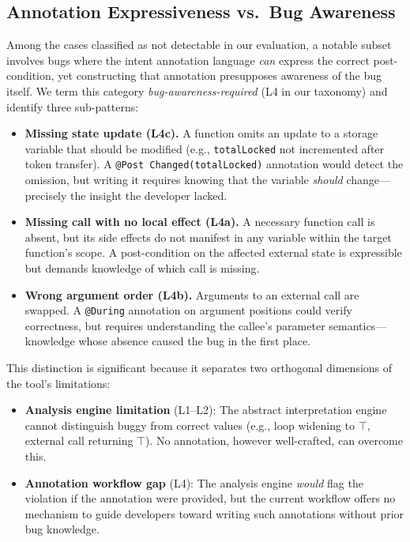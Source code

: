 \documentclass[pdflatex,sn-basic]{sn-jnl}%
\theoremstyle{thmstyleone}%
\theoremstyle{thmstyletwo}%
\theoremstyle{thmstylethree}%
\begin{document}
\subsection{Annotation Expressiveness vs.\ Bug Awareness}

Among the cases classified as not detectable in our evaluation,
a notable subset involves bugs where the intent annotation language \emph{can} express the correct post-condition,
yet constructing that annotation presupposes awareness of the bug itself.
We term this category \emph{bug-awareness-required} (L4 in our taxonomy) and identify three sub-patterns:

\begin{itemize}
  \item \textbf{Missing state update (L4c).}
    A function omits an update to a storage variable that should be modified
    (e.g., \texttt{totalLocked} not incremented after token transfer).
    A \texttt{@Post Changed(totalLocked)} annotation would detect the omission,
    but writing it requires knowing that the variable \emph{should} change---precisely the insight the developer lacked.
  \item \textbf{Missing call with no local effect (L4a).}
    A necessary function call is absent, but its side effects do not manifest
    in any variable within the target function's scope.
    A post-condition on the affected external state is expressible
    but demands knowledge of which call is missing.
  \item \textbf{Wrong argument order (L4b).}
    Arguments to an external call are swapped.
    A \texttt{@During} annotation on argument positions could verify correctness,
    but requires understanding the callee's parameter semantics---knowledge
    whose absence caused the bug in the first place.
\end{itemize}

This distinction is significant because it separates two orthogonal dimensions of the tool's limitations:

\begin{itemize}
  \item \textbf{Analysis engine limitation} (L1--L2):
    The abstract interpretation engine cannot distinguish buggy from correct values
    (e.g., loop widening to $\top$, external call returning $\top$).
    No annotation, however well-crafted, can overcome this.
  \item \textbf{Annotation workflow gap} (L4):
    The analysis engine \emph{would} flag the violation if the annotation were provided,
    but the current workflow offers no mechanism to guide developers
    toward writing such annotations without prior bug knowledge.
\end{itemize}
\end{document}
